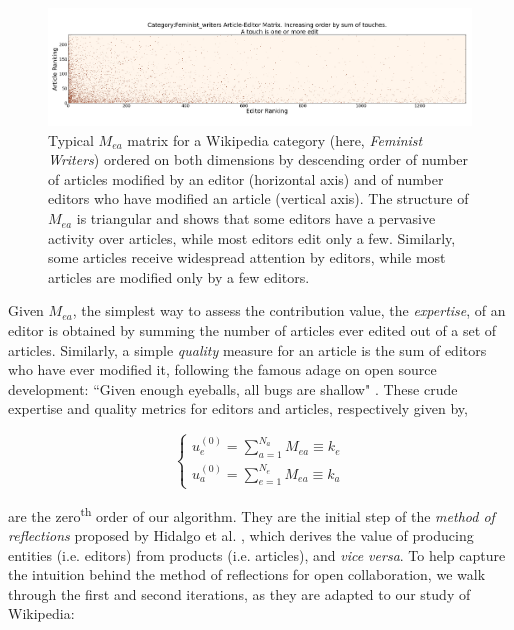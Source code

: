 \begin{figure}[!t]
\centering
\includegraphics[width=2.0\columnwidth]{../Figures/Category_Feminist_writerstriangle_matrix_corrected.png}
\caption{Typical $\mathbf{\mathit{M_{ea}}}$ matrix for a Wikipedia category (here, {\it Feminist Writers}) ordered on both dimensions by descending order of number of articles modified by an editor (horizontal axis) and of number editors who have modified an article (vertical axis). The structure of $\mathbf{\mathit{M_{ea}}}$ is triangular and shows that some editors have a pervasive activity over articles, while most editors edit only a few. Similarly, some articles receive widespread attention by editors, while most articles are modified only by a few editors.}
\label{fig:triangle}
\end{figure}


Given $M_{ea}$, the simplest way to assess the contribution value, the {\it expertise}, of an editor is obtained by summing the number of articles ever edited out of a set of articles. Similarly, a simple {\it quality} measure for an article is the sum of editors who have ever modified it, following the famous adage on open source development: ``Given enough eyeballs, all bugs are shallow" \cite{raymond1999}. These crude expertise and quality metrics for editors and articles, respectively  given by,

\begin{equation}
\begin{cases}
 u_{e}^{(0)} = \sum_{a=1}^{N_{a}} M_{ea} \equiv k_e\\[7pt]
 u_{a}^{(0)} = \sum_{e=1}^{N_{e}} M_{ea} \equiv k_a
\end{cases}
\label{HHinit}
\end{equation}

are the zero\textsuperscript{th} order of our algorithm. They are the initial step of the {\it method of reflections} proposed by Hidalgo et al. \cite{hidalgo2007,hidalgo2009}, which derives the value of producing entities (i.e. editors) from products (i.e. articles), and {\it vice versa}. To help capture the intuition behind the method of reflections for open collaboration, we walk through the first and second iterations, as they are adapted to our study of Wikipedia:

